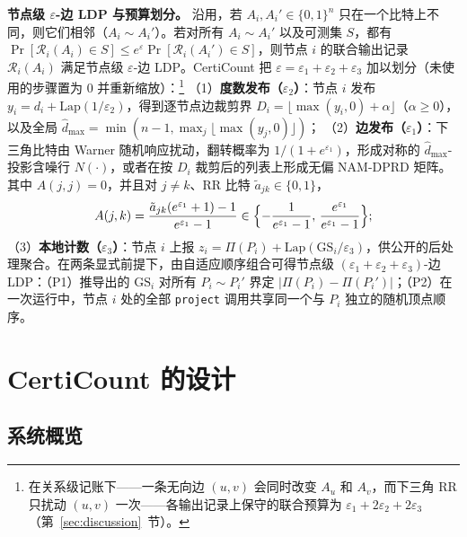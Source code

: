 \documentclass[11pt]{article}
\newlength{\zhindent}
\newcommand{\parhead}[1]{\par\noindent\hspace*{\zhindent}\textbf{#1}}
\theoremstyle{ieeeitalic}
\newcommand{\GS}{\mathrm{GS}}
\newcommand{\dhatmax}{\hat{d}_{\max}}
\newcommand{\Lap}{\mathrm{Lap}}
\begin{document}
\parhead{节点级 $\varepsilon$-边 LDP 与预算划分。}
沿用\cite{imola2021locally,zhang2026psc}，若 $A_i, A_i' \in \{0,1\}^n$ 只在一个比特上不同，则它们相邻（$A_i \sim A_i'$）。若对所有 $A_i \sim A_i'$ 以及可测集 $S$，都有 $\Pr[\mathcal{R}_i(A_i) \in S] \le e^{\varepsilon}\Pr[\mathcal{R}_i(A_i') \in S]$，则节点 $i$ 的联合输出记录 $\mathcal{R}_i(A_i)$ 满足节点级 $\varepsilon$-边 LDP。CertiCount 把 $\varepsilon = \varepsilon_1 + \varepsilon_2 + \varepsilon_3$ 加以划分（未使用的步骤置为 $0$ 并重新缩放）：\footnote{在关系级记账下——一条无向边 $(u,v)$ 会同时改变 $A_u$ 和 $A_v$，而下三角 RR 只扰动 $(u,v)$ 一次——各输出记录上保守的联合预算为 $\varepsilon_1 + 2\varepsilon_2 + 2\varepsilon_3$（第~\ref{sec:discussion}~节）。}
（1）\textbf{度数发布（$\varepsilon_2$）}：节点 $i$ 发布 $y_i = d_i + \Lap(1/\varepsilon_2)$，得到逐节点边裁剪界 $D_i = \lfloor \max(y_i, 0) + \alpha \rfloor$\cite{imola2022communication}（$\alpha \ge 0$），以及全局 $\dhatmax = \min(n-1, \max_j \lfloor \max(y_j, 0) \rfloor)$；
（2）\textbf{边发布（$\varepsilon_1$）}：下三角比特由 Warner 随机响应扰动，翻转概率为 $1/(1+e^{\varepsilon_1})$，形成对称的 $\dhatmax$-投影含噪行 $N(\cdot)$，或者在按 $D_i$ 裁剪后的列表上形成无偏 NAM-DPRD 矩阵\cite{guo2025nam}。其中 $A(j,j)=0$，并且对 $j \neq k$、RR 比特 $\tilde{a}_{jk} \in \{0,1\}$，
\begin{equation}
A(j,k) = \frac{\tilde{a}_{jk}(e^{\varepsilon_1}+1)-1}{e^{\varepsilon_1}-1} \in \Bigl\{-\frac{1}{e^{\varepsilon_1}-1},\, \frac{e^{\varepsilon_1}}{e^{\varepsilon_1}-1}\Bigr\};
\label{eq:nam}
\end{equation}
（3）\textbf{本地计数（$\varepsilon_3$）}：节点 $i$ 上报 $z_i = \Pi(P_i) + \Lap(\GS_i/\varepsilon_3)$，供公开的后处理聚合。在两条显式前提下，由自适应顺序组合\cite{dwork2014algorithmic}可得节点级 $(\varepsilon_1+\varepsilon_2+\varepsilon_3)$-边 LDP：（P1）推导出的 $\GS_i$ 对所有 $P_i \sim P_i'$ 界定 $|\Pi(P_i)-\Pi(P_i')|$；（P2）在一次运行中，节点 $i$ 处的全部 \texttt{project} 调用共享同一个与 $P_i$ 独立的随机顶点顺序。

\section{\texorpdfstring{\textbf{CertiCount} 的设计}{CertiCount 的设计}}
\label{sec:design}

\subsection{系统概览}
\label{sec:overview}
\end{document}
